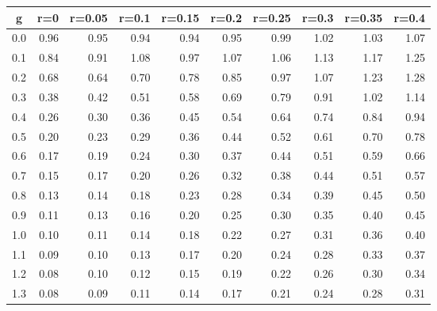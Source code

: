 %
\begin{table}[!tbp]
 \begin{center}
 \begin{tabular}{rrrrrrrrrr}\hline\hline
\multicolumn{1}{c}{g}&\multicolumn{1}{c}{r=0}&\multicolumn{1}{c}{r=0.05}&\multicolumn{1}{c}{r=0.1}&\multicolumn{1}{c}{r=0.15}&\multicolumn{1}{c}{r=0.2}&\multicolumn{1}{c}{r=0.25}&\multicolumn{1}{c}{r=0.3}&\multicolumn{1}{c}{r=0.35}&\multicolumn{1}{c}{r=0.4}\tabularnewline
\hline
0.0&0.96&0.95&0.94&0.94&0.95&0.99&1.02&1.03&1.07\tabularnewline
0.1&0.84&0.91&1.08&0.97&1.07&1.06&1.13&1.17&1.25\tabularnewline
0.2&0.68&0.64&0.70&0.78&0.85&0.97&1.07&1.23&1.28\tabularnewline
0.3&0.38&0.42&0.51&0.58&0.69&0.79&0.91&1.02&1.14\tabularnewline
0.4&0.26&0.30&0.36&0.45&0.54&0.64&0.74&0.84&0.94\tabularnewline
0.5&0.20&0.23&0.29&0.36&0.44&0.52&0.61&0.70&0.78\tabularnewline
0.6&0.17&0.19&0.24&0.30&0.37&0.44&0.51&0.59&0.66\tabularnewline
0.7&0.15&0.17&0.20&0.26&0.32&0.38&0.44&0.51&0.57\tabularnewline
0.8&0.13&0.14&0.18&0.23&0.28&0.34&0.39&0.45&0.50\tabularnewline
0.9&0.11&0.13&0.16&0.20&0.25&0.30&0.35&0.40&0.45\tabularnewline
1.0&0.10&0.11&0.14&0.18&0.22&0.27&0.31&0.36&0.40\tabularnewline
1.1&0.09&0.10&0.13&0.17&0.20&0.24&0.28&0.33&0.37\tabularnewline
1.2&0.08&0.10&0.12&0.15&0.19&0.22&0.26&0.30&0.34\tabularnewline
1.3&0.08&0.09&0.11&0.14&0.17&0.21&0.24&0.28&0.31\tabularnewline
\hline
\end{tabular}

\end{center}

\end{table}

